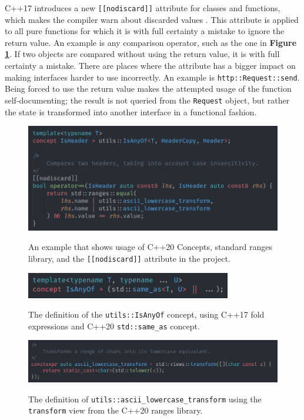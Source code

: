 \documentclass[12pt, a4paper]{article}
\begin{document}
C++17 introduces a new \texttt{[[nodiscard]]} attribute for classes and functions, which makes the compiler warn about discarded values \parencite{CppNodiscard}. This attribute is applied to all pure functions for which it is with full certainty a mistake to ignore the return value. An example is any comparison operator, such as the one in \textbf{Figure \ref{fig:constraints_example}}. If two objects are compared without using the return value, it is with full certainty a mistake. There are places where the attribute has a bigger impact on making interfaces harder to use incorrectly. An example is \texttt{http::Request::send}. Being forced to use the return value makes the attempted usage of the function self-documenting; the result is not queried from the \texttt{Request} object, but rather the state is transformed into another interface in a functional fashion.

\begin{figure}[hp]
	\centering
	\caption{An example that shows usage of C++20 Concepts, standard ranges library, and the \texttt{[[nodiscard]]} attribute in the project.}
	\includegraphics[width=\textwidth]{constraints_example}
	\label{fig:constraints_example}
\end{figure}

\begin{figure}[hp]
	\centering
	\caption{The definition of the \texttt{utils::IsAnyOf} concept, using C++17 fold expressions and C++20 \texttt{std::same\_as} concept.}
	\includegraphics[width=0.8\textwidth]{is_any_of_concept}
	\label{fig:is_any_of_concept}
\end{figure}

\begin{figure}[hp]
	\centering
	\caption{The definition of \texttt{utils::ascii\_lowercase\_transform} using the \texttt{transform} view from the C++20 ranges library.}
	\includegraphics[width=\textwidth]{lowercase_transform_definition}
	\label{fig:lowercase_transform_definition}
\end{figure}
\end{document}
